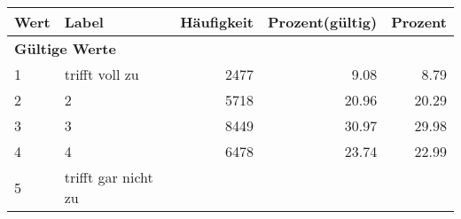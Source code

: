      \begin{longtable}{lXrrr}
     \toprule
     \textbf{Wert} & \textbf{Label} & \textbf{Häufigkeit} & \textbf{Prozent(gültig)} & \textbf{Prozent} \\
     \endhead
     \midrule
     \multicolumn{5}{l}{\textbf{Gültige Werte}}\\

     1 &
     \multicolumn{1}{X}{ trifft voll zu   } &


       \num{2477} &
       \num[round-mode=places,round-precision=2]{9.08} &
         \num[round-mode=places,round-precision=2]{8.79} \\

     2 &
     \multicolumn{1}{X}{ 2   } &


       \num{5718} &
       \num[round-mode=places,round-precision=2]{20.96} &
         \num[round-mode=places,round-precision=2]{20.29} \\

     3 &
     \multicolumn{1}{X}{ 3   } &


       \num{8449} &
       \num[round-mode=places,round-precision=2]{30.97} &
         \num[round-mode=places,round-precision=2]{29.98} \\

     4 &
     \multicolumn{1}{X}{ 4   } &


       \num{6478} &
       \num[round-mode=places,round-precision=2]{23.74} &
         \num[round-mode=places,round-precision=2]{22.99} \\

     5 &
     \multicolumn{1}{X}{ trifft gar nicht zu   } &



\end{longtable}
